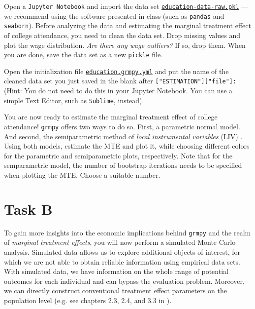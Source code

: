 \begin{boenumerate}

  \item Open a \texttt{Jupyter Notebook} and import the data set \href{https://github.com/HumanCapitalAnalysis/microeconometrics/blob/master/problem-sets/04-generalized-roy-model/data/education_data_raw.pkl}{\texttt{education-data-raw.pkl}} --- we recommend using the software presented in class (such as \texttt{pandas} and \texttt{seaborn}). 
  Before analyzing the data and estimating the marginal treatment effect of college attendance, you need to clean the data set. Drop missing values and plot the wage distribution. \emph{Are there any wage outliers?} If so, drop them.
  When you are done, save the data set as a new \texttt{pickle} file.
  
   \item Open the initialization file \href{https://github.com/HumanCapitalAnalysis/microeconometrics/blob/master/problem-sets/04-generalized-roy-model/sources/education.grmpy.yml}{\texttt{education.grmpy.yml}} and put the name of the cleaned data set you just saved in the blank after \texttt{["ESTIMATION"]["file"]:} (Hint: You do not need to do this in your Jupyter Notebook. You can use a simple Text Editor, such as \texttt{Sublime}, instead).
   
   \item You are now ready to estimate the marginal treatment effect of college attendance! \texttt{grmpy} offers two ways to do so. First, a parametric normal model. And second, the semiparametric method of \emph{local instrumental variables} (LIV) \citep{Heckman.2006d}.
   Using both models, estimate the MTE and plot it, while choosing different colors for the parametric and semiparametric plots, respectively. Note that for the semparametric model, the number of bootstrap iterations needs to be specified when plotting the MTE. Choose a suitable number.

\end{boenumerate}


\section*{Task B}

   To gain more insights into the economic implications behind \texttt{grmpy} and the realm of \emph{marginal treatment effects}, you will now perform a simulated Monte Carlo analysis. 
   Simulated data allows us to explore additional objects of interest, for which we are not able to obtain reliable information using empirical data sets. With simulated data, we have information on the whole range of potential outcomes for each individual and can bypass the evaluation problem. Moreover, we can directly construct conventional treatment effect parameters on the population level (e.g. see chapters 2.3, 2.4, and 3.3 in \cite{Heckman.2007e}).
   
